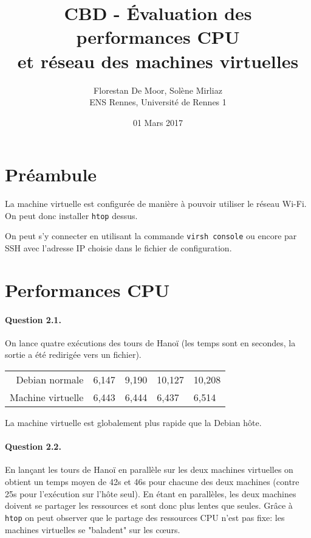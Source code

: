 \documentclass[a4paper]{article}
\begin{document}
\title{CBD - Évaluation des performances CPU\\ et réseau des machines virtuelles}
\author{Florestan De Moor, Solène Mirliaz\\ ENS Rennes, Université de Rennes 1}
\date{01 Mars 2017}

\maketitle

\section{Préambule}

La machine virtuelle est configurée de manière à pouvoir utiliser le réseau Wi-Fi.
On peut donc installer \texttt{htop} dessus.

On peut s'y connecter en utilisant la commande \texttt{virsh console} ou encore par SSH avec l'adresse IP choisie dans le fichier de configuration.

\section{Performances CPU}

\paragraph{Question 2.1.} On lance quatre exécutions des tours de Hanoï (les temps sont en secondes, la sortie a été redirigée vers un fichier).
\begin{center}
\begin{tabular}{r|l l l l}
Debian normale & 6,147 & 9,190 & 10,127 & 10,208 \\
Machine virtuelle & 6,443 & 6,444 & 6,437 & 6,514
\end{tabular}
\end{center}
La machine virtuelle est globalement plus rapide que la Debian hôte.

\paragraph{Question 2.2.} En lançant les tours de Hanoï en parallèle sur les deux machines virtuelles on obtient un temps moyen de 42s et 46s pour chacune des deux machines (contre 25s pour l'exécution sur l'hôte seul). En étant en parallèles, les deux machines doivent se partager les ressources et sont donc plus lentes que seules. Grâce à \texttt{htop} on peut observer que le partage des ressources CPU n'est pas fixe: les machines virtuelles se "baladent" sur les cœurs.
\end{document}

